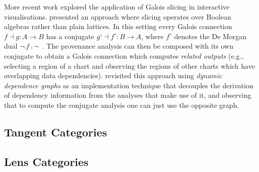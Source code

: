 More recent work explored the application of Galois slicing in interactive visualisations. \citet{perera22}
presented an approach where slicing operates over Boolean algebras rather than plain lattices. In this setting
every Galois connection $f \dashv g: A \to B$ has a conjugate $g^\circ \dashv f^\circ: B \to A$, where
$f^\circ$ denotes the De Morgan dual $\neg \comp f \comp \neg$~\cite{jonsson51}. The provenance analysis can
then be composed with its own conjugate to obtain a Galois connection which computes \emph{related outputs}
(e.g., selecting a region of a chart and observing the regions of other charts which have overlapping data
dependencies). \citet{bond25} revisited this approach using \emph{dynamic dependence graphs} as an
implementation technique that decouples the derivation of dependency information from the analyses that make
use of it, and observing that to compute the conjugate analysis one can just use the opposite graph.

\subsection{Tangent Categories}

\cite{cockett14,cockett18}

\subsection{Lens Categories}

\cite{spivak19}
